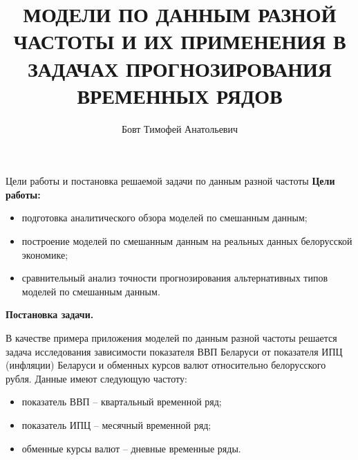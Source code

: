 \documentclass[notheorems, 10pt]{beamer}
\title[Модели по данным разной частоты]{\Large МОДЕЛИ ПО ДАННЫМ РАЗНОЙ ЧАСТОТЫ И ИХ ПРИМЕНЕНИЯ В ЗАДАЧАХ ПРОГНОЗИРОВАНИЯ ВРЕМЕННЫХ РЯДОВ}
\author[Т. А. Бовт]{Бовт Тимофей Анатольевич}
\institute[]{Научный руководитель: В.И. Малюгин}
\date[]{}%
\begin{document}
\begin{frame}[plain]
  \titlepage
\end{frame}


\begin{frame}{Цели работы и постановка решаемой задачи по данным разной частоты}
	\textbf{Цели работы:}
	\begin{itemize}
		\item подготовка аналитического обзора моделей по смешанным данным;
		\item построение моделей по смешанным данным на реальных данных белорусской экономике;
		\item сравнительный анализ точности прогнозирования альтернативных типов моделей по смешанным данным.
	\end{itemize}
	\textbf{Постановка задачи.} 
	
	В качестве примера приложения моделей по данным разной частоты решается задача исследования зависимости показателя ВВП Беларуси от показателя ИПЦ (инфляции) Беларуси и обменных курсов валют относительно белорусского рубля. Данные имеют следующую частоту:
	\begin{itemize}
		\item показатель ВВП -- квартальный временной ряд;
		\item показатель ИПЦ -- месячный временной ряд;
		\item обменные курсы валют -- дневные временные ряды.
	\end{itemize}
\end{frame}

\end{document}
